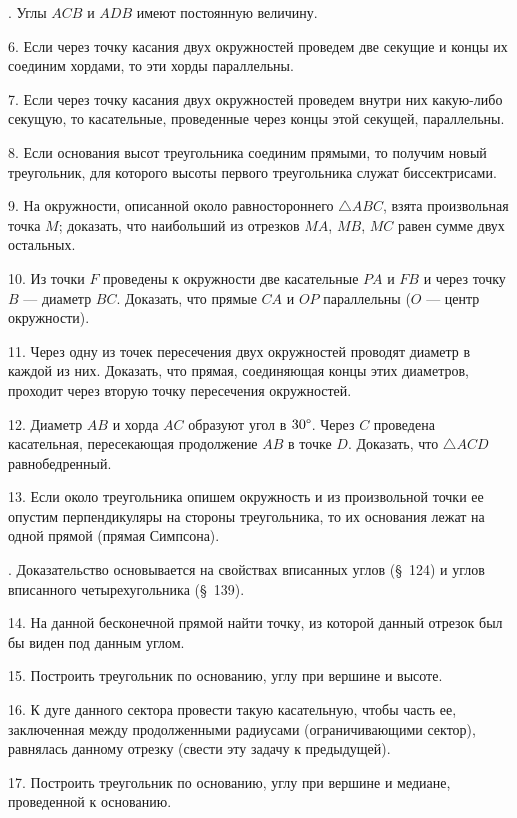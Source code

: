 \documentclass[oneside]{book}
\begin{document}
.
Углы $ACB$ и $ADB$ имеют постоянную величину.

6.
Если через точку касания двух окружностей проведем две секущие и концы их соединим хордами, то эти хорды параллельны.

7.
Если через точку касания двух окружностей проведем внутри них какую-либо секущую, то касательные, проведенные через концы этой секущей, параллельны.

8.
Если основания высот треугольника соединим прямыми, то получим новый треугольник, для которого высоты первого треугольника служат биссектрисами. %

9.
На окружности, описанной около равностороннего $\triangle ABC$, взята произвольная точка $M$;
доказать, что наибольший из отрезков $MA$, $MB$, $MC$ равен сумме двух остальных.

10.
Из точки $F$ проведены к окружности две касательные $PA$ и $FB$ и через точку $B$ — диаметр $BC$.
Доказать, что прямые $CA$ и $OP$ параллельны ($O$ — центр окружности).

11.
Через одну из точек пересечения двух окружностей проводят диаметр в каждой из них.
Доказать, что прямая, соединяющая концы этих диаметров, проходит через вторую точку пересечения окружностей.

12.
Диаметр $AB$ и хорда $AC$ образуют угол в $30\degree$.
Через $C$ проведена касательная, пересекающая продолжение $AB$ в точке $D$.
Доказать, что $\triangle ACD$ равнобедренный.

13.
Если около треугольника опишем окружность и из произвольной точки ее опустим перпендикуляры на стороны треугольника, то их основания лежат на одной прямой (прямая Симпсона).

.
Доказательство основывается на свойствах вписанных углов (§~124) и углов вписанного четырехугольника (§~139).



14.
На данной бесконечной прямой найти точку, из которой данный отрезок был бы виден под данным углом.

15.
Построить треугольник по основанию, углу при вершине и высоте.

16.
К дуге данного сектора провести такую касательную, чтобы часть ее, заключенная между продолженными радиусами (ограничивающими сектор), равнялась данному отрезку (свести эту задачу к предыдущей).

17.
Построить треугольник по основанию, углу при вершине и медиане, проведенной к основанию.
\end{document}
